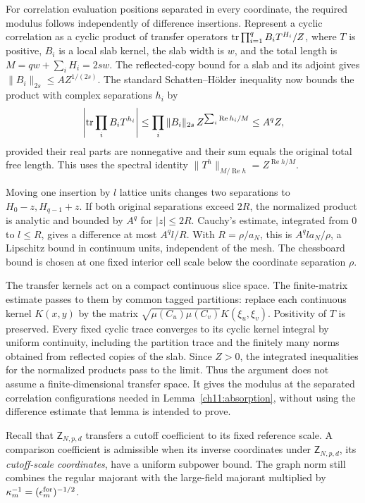 For correlation evaluation positions separated in every coordinate, the required
modulus follows independently of difference insertions. Represent a
cyclic correlation as a cyclic product of transfer operators
$\operatorname{tr}\prod_{i=1}^q B_iT^{H_i}/Z$, where $T$ is positive,
$B_i$ is a local slab kernel, the slab width is $w$, and the total
length is $M=qw+\sum_iH_i=2sw$.
The reflected-copy bound for a slab and its adjoint gives
$\|B_i\|_{2s}\le A Z^{1/(2s)}$.
The standard Schatten--H\"older inequality
\cite[Theorem~6.32]{TroppMatrixAnalysis2022} now bounds the product with
complex separations $h_i$ by
\[
 \left|\operatorname{tr}\prod_iB_iT^{h_i}\right|
 \le\prod_i\|B_i\|_{2s}\,
                 Z^{\sum_i\operatorname{Re}h_i/M}
 \le A^q Z ,
\]
provided their real parts are nonnegative and their sum equals the
original total free length. This uses the spectral identity
$\|T^h\|_{M/\operatorname{Re}h}=Z^{\operatorname{Re}h/M}$.

Moving one insertion by $l$ lattice units changes two separations to
$H_0-z,H_{q-1}+z$. If both original separations exceed $2R$,
the normalized product is analytic and bounded by $A^q$ for $|z|\le2R$.
Cauchy's estimate, integrated from $0$ to $l\le R$, gives a
difference at most $A^q l/R$. With $R=\rho/a_N$, this is
$A^q la_N/\rho$, a Lipschitz bound in continuum units, independent of the mesh.
The chessboard bound is chosen at one fixed interior cell scale below
the coordinate separation $\rho$.

The transfer kernels act on a compact continuous slice space.
The finite-matrix estimate passes to them by common tagged partitions:
replace each continuous kernel $K(x,y)$ by the matrix
$\sqrt{\mu(C_u)\mu(C_v)}K(\xi_u,\xi_v)$.
Positivity of $T$ is preserved. Every fixed cyclic trace converges
to its cyclic kernel integral by uniform continuity, including the
partition trace and the finitely many norms obtained from reflected copies of the slab.
Since $Z>0$, the integrated inequalities for the normalized products pass to the limit.
Thus the argument does not assume a finite-dimensional transfer space.
It gives the modulus at the separated correlation configurations needed
in Lemma~\ref{ch11:absorption}, without using the difference estimate
that lemma is intended to prove.

Recall that $\mathsf Z_{N,p,d}$ transfers a cutoff coefficient to
its fixed reference scale. A comparison coefficient is admissible
when its inverse coordinates under $\mathsf Z_{N,p,d}$, its \emph{cutoff-scale coordinates}, have a
uniform subpower bound. The graph norm still combines the regular
majorant with the large-field majorant multiplied by
$\kappa_m^{-1}=(\epsilon_m^{\rm for})^{-1/2}$.

